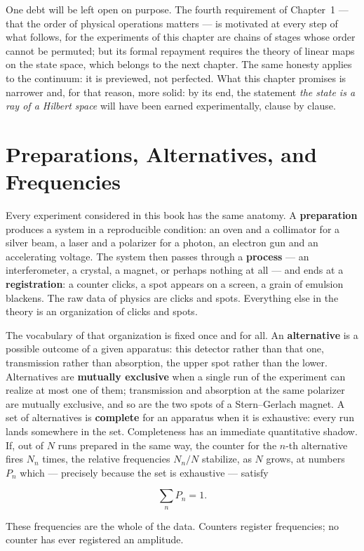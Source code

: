 One debt will be left open on purpose. The fourth requirement of Chapter~1 --- that the order of physical operations matters --- is motivated at every step of what follows, for the experiments of this chapter are chains of stages whose order cannot be permuted; but its formal repayment requires the theory of linear maps on the state space, which belongs to the next chapter. The same honesty applies to the continuum: it is previewed, not perfected. What this chapter promises is narrower and, for that reason, more solid: by its end, the statement \emph{the state is a ray of a Hilbert space} will have been earned experimentally, clause by clause.

\section{Preparations, Alternatives, and Frequencies}
\label{sec:alternatives}

Every experiment considered in this book has the same anatomy. A \textbf{preparation} produces a system in a reproducible condition: an oven and a collimator for a silver beam, a laser and a polarizer for a photon, an electron gun and an accelerating voltage. The system then passes through a \textbf{process} --- an interferometer, a crystal, a magnet, or perhaps nothing at all --- and ends at a \textbf{registration}: a counter clicks, a spot appears on a screen, a grain of emulsion blackens. The raw data of physics are clicks and spots. Everything else in the theory is an organization of clicks and spots.

The vocabulary of that organization is fixed once and for all. An \textbf{alternative} is a possible outcome of a given apparatus: this detector rather than that one, transmission rather than absorption, the upper spot rather than the lower. Alternatives are \textbf{mutually exclusive} when a single run of the experiment can realize at most one of them; transmission and absorption at the same polarizer are mutually exclusive, and so are the two spots of a Stern--Gerlach magnet. A set of alternatives is \textbf{complete} for an apparatus when it is exhaustive: every run lands somewhere in the set. Completeness has an immediate quantitative shadow. If, out of $N$ runs prepared in the same way, the counter for the $n$-th alternative fires $N_n$ times, the relative frequencies $N_n/N$ stabilize, as $N$ grows, at numbers $P_n$ which --- precisely because the set is exhaustive --- satisfy
\begin{linenomath}
\begin{equation}
    \sum_n P_n = 1 .
\end{equation}
\end{linenomath}
These frequencies are the whole of the data. Counters register frequencies; no counter has ever registered an amplitude.

